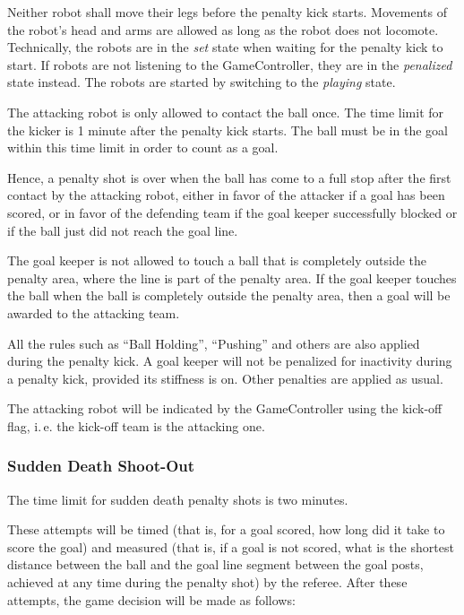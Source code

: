 \documentclass[12pt]{article}
\newcommand{\ie}{\mbox{i.\,e.}\xspace}
\begin{document}
Neither robot shall move their legs before the penalty kick starts. Movements of the robot's head and arms are allowed as long as the robot does not locomote. Technically, the robots are in the \emph{set} state when waiting for the penalty kick to start. If robots are not listening to the GameController, they are in the \emph{penalized} state instead. The robots are started by switching to the \emph{playing} state.

The attacking robot is only allowed to contact the ball once.  The time limit for the kicker is 1 minute after the penalty kick starts. The ball must be in the goal within this time limit in order to count as a goal.

Hence, a penalty shot is over when the ball has come to a full stop after the first contact by the attacking robot, either in favor of the attacker if a goal has been scored, or in favor of the defending team if the goal keeper successfully blocked or if the ball just did not reach the goal line.

The goal keeper is not allowed to touch a ball that is completely outside the penalty area, where the line is part of the penalty area. If the goal keeper touches the ball when the ball is completely outside the penalty area, then a goal will be awarded to the attacking team.

All the rules such as ``Ball Holding'', ``Pushing'' and others are also applied during the penalty kick.  A goal keeper will not be penalized for inactivity during a penalty kick, provided its stiffness is on. Other penalties are applied as usual.

The attacking robot will be indicated by the GameController using the kick-off flag, \ie the kick-off team is the attacking one.

\subsubsection{Sudden Death Shoot-Out}

The time limit for sudden death penalty shots is two minutes.

These attempts will be timed (that is, for a goal scored, how long did it take to score the goal) and measured (that is, if a goal is not scored, what is the shortest distance between the ball and the goal line segment between the goal posts, achieved at any time during the penalty shot) by the referee. After these attempts, the game decision will be made as follows:
\end{document}
